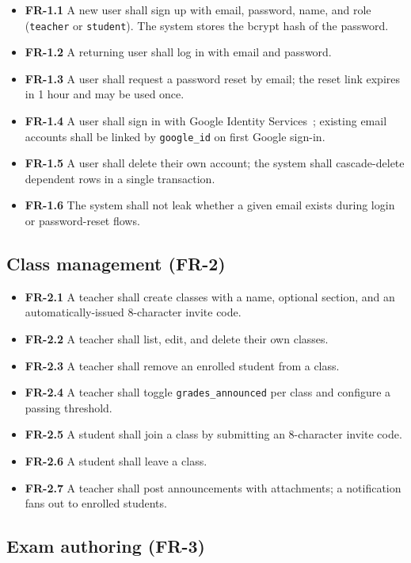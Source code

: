 \begin{itemize}
  \item \textbf{FR-1.1} A new user shall sign up with email, password, name, and role (\texttt{teacher} or \texttt{student}). The system stores the bcrypt hash of the password.
  \item \textbf{FR-1.2} A returning user shall log in with email and password.
  \item \textbf{FR-1.3} A user shall request a password reset by email; the reset link expires in 1 hour and may be used once.
  \item \textbf{FR-1.4} A user shall sign in with Google Identity Services~\cite{gids}; existing email accounts shall be linked by \texttt{google\_id} on first Google sign-in.
  \item \textbf{FR-1.5} A user shall delete their own account; the system shall cascade-delete dependent rows in a single transaction.
  \item \textbf{FR-1.6} The system shall not leak whether a given email exists during login or password-reset flows.
\end{itemize}

\subsection{Class management (FR-2)}

\begin{itemize}
  \item \textbf{FR-2.1} A teacher shall create classes with a name, optional section, and an automatically-issued 8-character invite code.
  \item \textbf{FR-2.2} A teacher shall list, edit, and delete their own classes.
  \item \textbf{FR-2.3} A teacher shall remove an enrolled student from a class.
  \item \textbf{FR-2.4} A teacher shall toggle \texttt{grades\_announced} per class and configure a passing threshold.
  \item \textbf{FR-2.5} A student shall join a class by submitting an 8-character invite code.
  \item \textbf{FR-2.6} A student shall leave a class.
  \item \textbf{FR-2.7} A teacher shall post announcements with attachments; a notification fans out to enrolled students.
\end{itemize}

\subsection{Exam authoring (FR-3)}

